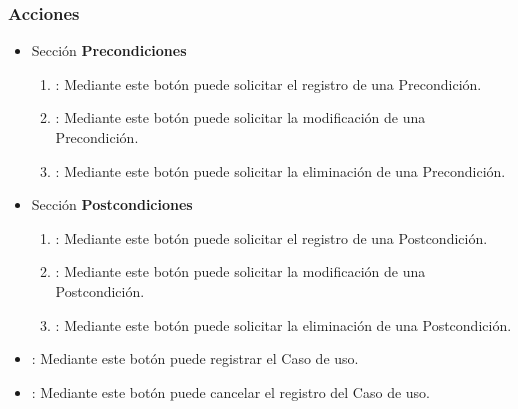 \subsubsection{Acciones}
\begin{itemize}
 \item Sección \textbf{Precondiciones}
  \begin{enumerate}
	\item {}: Mediante este botón puede solicitar el registro de una Precondición.
	\item {}: Mediante este botón puede solicitar la modificación de una Precondición.
	\item {}: Mediante este botón puede solicitar la eliminación de una Precondición.
  \end{enumerate}
 \item Sección \textbf{Postcondiciones}
  \begin{enumerate}
	\item {}: Mediante este botón puede solicitar el registro de una Postcondición.
	\item {}: Mediante este botón puede solicitar la modificación de una Postcondición.
	\item {}: Mediante este botón puede solicitar la eliminación de una Postcondición.
  \end{enumerate}
 \item {}: Mediante este botón puede registrar el Caso de uso.
 \item {}: Mediante este botón puede cancelar el registro del Caso de uso.
\end{itemize}
	
	
